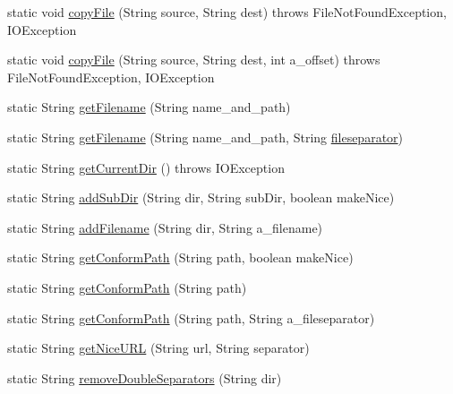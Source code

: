 \begin{DoxyCompactItemize}
\item 
static void \hyperlink{classorg_1_1jgap_1_1util_1_1_file_kit_a6cec1f11600c7d36535fa15160c005d2}{copy\-File} (String source, String dest)  throws File\-Not\-Found\-Exception, I\-O\-Exception 
\item 
static void \hyperlink{classorg_1_1jgap_1_1util_1_1_file_kit_a4dd80302aee8844b8008b45319e5ac93}{copy\-File} (String source, String dest, int a\-\_\-offset)  throws File\-Not\-Found\-Exception, I\-O\-Exception 
\item 
static String \hyperlink{classorg_1_1jgap_1_1util_1_1_file_kit_a04427661b9434f2ebca8a7c496b024f8}{get\-Filename} (String name\-\_\-and\-\_\-path)
\item 
static String \hyperlink{classorg_1_1jgap_1_1util_1_1_file_kit_af68540ad9faa606310ee8952ca57d894}{get\-Filename} (String name\-\_\-and\-\_\-path, String \hyperlink{classorg_1_1jgap_1_1util_1_1_file_kit_a96b5f1e3321a4cf8bc43873ec55866d1}{fileseparator})
\item 
static String \hyperlink{classorg_1_1jgap_1_1util_1_1_file_kit_a4f54c43debcb49fff42ffdb3cdd7b9ce}{get\-Current\-Dir} ()  throws I\-O\-Exception 
\item 
static String \hyperlink{classorg_1_1jgap_1_1util_1_1_file_kit_ad59565428f7a3ee8686f33c456634891}{add\-Sub\-Dir} (String dir, String sub\-Dir, boolean make\-Nice)
\item 
static String \hyperlink{classorg_1_1jgap_1_1util_1_1_file_kit_afb5ce479adc0602fde503431eb0efbb2}{add\-Filename} (String dir, String a\-\_\-filename)
\item 
static String \hyperlink{classorg_1_1jgap_1_1util_1_1_file_kit_a39df4332889cc4ad30237e420843f84a}{get\-Conform\-Path} (String path, boolean make\-Nice)
\item 
static String \hyperlink{classorg_1_1jgap_1_1util_1_1_file_kit_a3d433bbfb2bfa827d97dc1cf1a0a5027}{get\-Conform\-Path} (String path)
\item 
static String \hyperlink{classorg_1_1jgap_1_1util_1_1_file_kit_a46f3a57d515b853ce2e24344d8c0eed5}{get\-Conform\-Path} (String path, String a\-\_\-fileseparator)
\item 
static String \hyperlink{classorg_1_1jgap_1_1util_1_1_file_kit_a01d978bc98e3c1ea2e568eaa3fedf311}{get\-Nice\-U\-R\-L} (String url, String separator)
\item 
static String \hyperlink{classorg_1_1jgap_1_1util_1_1_file_kit_ae300139f676867d422777b884f995c49}{remove\-Double\-Separators} (String dir)

\end{DoxyCompactItemize}
